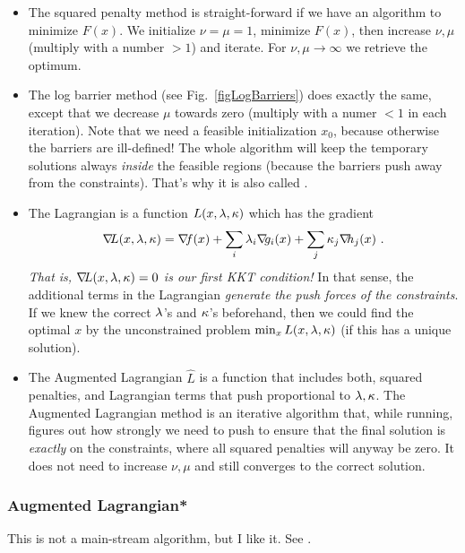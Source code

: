 \begin{itemize}
\item The squared penalty method is straight-forward if we have an
algorithm to minimize $F(x)$. We initialize $\nu=\mu=1$, minimize
$F(x)$, then increase $\nu,\mu$ (multiply with a number $>1$) and
iterate. For $\nu,\mu\to\infty$ we retrieve the optimum.

\item The log barrier method (see Fig.~\ref{figLogBarriers}) does
exactly the same, except that we decrease $\mu$ towards zero (multiply
with a numer $<1$ in each iteration). Note that we need a
feasible initialization $x_0$, because otherwise the barriers are
ill-defined! The whole algorithm will keep the temporary solutions
always \emph{inside} the feasible regions (because the barriers push
away from the constraints). That's why it is also
called .

\item The Lagrangian is a function $L(x,\lambda,\kappa)$ which has the gradient
\begin{equation}
\na L(x,\l,\k) = \na f(x) + \sum_i \l_i \na g_i(x) + \sum_j \k_j \na
h_j(x) ~.
\end{equation}
\emph{That is, ${\nabla_{\!\!}} L(x,\lambda,\kappa)=0$ is our first KKT condition!} In that
sense, the additional terms in the Lagrangian \emph{generate the push
forces of the constraints}. If we knew the correct $\lambda$'s and $\kappa$'s
beforehand, then we could find the optimal $x$ by the
unconstrained problem $\min_x L(x,\lambda,\kappa)$ (if this has a unique solution).

\item The Augmented Lagrangian $\hat L$ is a function that includes
 both, squared penalties, and Lagrangian terms that push proportional
 to $\lambda,\kappa$. The Augmented Lagrangian method is an
 iterative algorithm that, while running, figures out how strongly we
 need to push to ensure that the final solution is \emph{exactly} on
 the constraints, where all squared penalties will anyway be zero. It
 does not need to increase $\nu,\mu$ and still converges to the correct
 solution.
\end{itemize}



\subsubsection{Augmented Lagrangian*}

This is not a main-stream algorithm, but I like
it. See \citep{14-toussaint-AugLag}.


